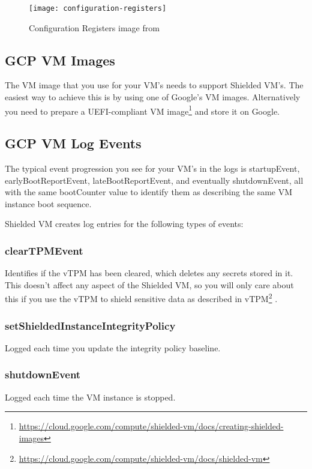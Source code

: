 \begin{figure}[!ht]
    \centering
    \texttt{[image: configuration-registers]}
    \caption{Configuration Registers image from \cite{arthur_platform_2015}}
    \label{fig:configuration-registers}
\end{figure}

\subsection{GCP VM Images}
The VM image that you use for your VM’s needs to support Shielded VM’s. 
The easiest way to achieve this is by using one of Google’s VM images. 
Alternatively you need to prepare a 
UEFI-compliant VM image\footnote{\url{https://cloud.google.com/compute/shielded-vm/docs/creating-shielded-images}} 
and store it on Google.

\subsection{GCP VM Log Events}
The typical event progression you see for your VM’s in the logs is startupEvent, 
earlyBootReportEvent, lateBootReportEvent, and eventually shutdownEvent, 
all with the same bootCounter value to identify them 
as describing the same VM instance boot sequence.

Shielded VM creates log entries for the following types of events:

\subsubsection*{clearTPMEvent}
Identifies if the vTPM has been cleared, which deletes any secrets stored in it. 
This doesn't affect any aspect of the Shielded VM, 
so you will only care about this if you use the vTPM 
to shield sensitive data as described in vTPM\footnote{\url{https://cloud.google.com/compute/shielded-vm/docs/shielded-vm}} 
\citep{google_what_2022}.

\subsubsection*{setShieldedInstanceIntegrityPolicy}
Logged each time you update the integrity policy baseline.

\subsubsection*{shutdownEvent}
Logged each time the VM instance is stopped.

